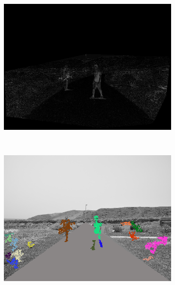 \begin{figure}[t]
\begin{subfigure}[b]{0.24\columnwidth}
	    \includegraphics[width=\textwidth]{pipeline/fig2}\label{fig:pipelineA_3}
        \end{subfigure}%
        ~
        \begin{subfigure}[b]{0.24\columnwidth}
	    \includegraphics[width=\textwidth]{pipeline/fig3}\label{fig:pipelineA_4}
        \end{subfigure}%
        \\
        \begin{subfigure}[b]{0.24\columnwidth}

\end{subfigure}
\end{figure}
